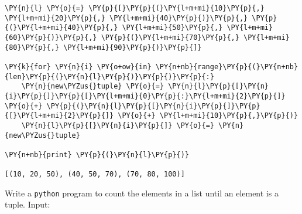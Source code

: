 \begin{Answer}
\begin{codebox}[size=fbox, boxrule=1pt, colback=cellbackground, colframe=cellborder]
\begin{Verbatim}[commandchars=\\\{\}]
\PY{n}{l} \PY{o}{=} \PY{p}{[}\PY{p}{(}\PY{l+m+mi}{10}\PY{p}{,} \PY{l+m+mi}{20}\PY{p}{,} \PY{l+m+mi}{40}\PY{p}{)}\PY{p}{,} \PY{p}{(}\PY{l+m+mi}{40}\PY{p}{,} \PY{l+m+mi}{50}\PY{p}{,} \PY{l+m+mi}{60}\PY{p}{)}\PY{p}{,} \PY{p}{(}\PY{l+m+mi}{70}\PY{p}{,} \PY{l+m+mi}{80}\PY{p}{,} \PY{l+m+mi}{90}\PY{p}{)}\PY{p}{]}

\PY{k}{for} \PY{n}{i} \PY{o+ow}{in} \PY{n+nb}{range}\PY{p}{(}\PY{n+nb}{len}\PY{p}{(}\PY{n}{l}\PY{p}{)}\PY{p}{)}\PY{p}{:}
    \PY{n}{new\PYZus{}tuple} \PY{o}{=} \PY{n}{l}\PY{p}{[}\PY{n}{i}\PY{p}{]}\PY{p}{[}\PY{l+m+mi}{0}\PY{p}{:}\PY{l+m+mi}{2}\PY{p}{]} \PY{o}{+} \PY{p}{(}\PY{n}{l}\PY{p}{[}\PY{n}{i}\PY{p}{]}\PY{p}{[}\PY{l+m+mi}{2}\PY{p}{]} \PY{o}{+} \PY{l+m+mi}{10}\PY{p}{,}\PY{p}{)}
    \PY{n}{l}\PY{p}{[}\PY{n}{i}\PY{p}{]} \PY{o}{=} \PY{n}{new\PYZus{}tuple}
    
\PY{n+nb}{print} \PY{p}{(}\PY{n}{l}\PY{p}{)}

[(10, 20, 50), (40, 50, 70), (70, 80, 100)]
\end{Verbatim}
\end{codebox} 
\end{Answer}

\begin{Exercise}
Write a \texttt{python} program to count the elements in a list until an element is a tuple.
Input:
\begin{Shaded}
\begin{Highlighting}[]
\NormalTok{\{[}\NormalTok{, }\NormalTok{, (}\NormalTok{,}\NormalTok{:}\NormalTok{\}]\}}
\end{Highlighting}
\end{Shaded}
\end{Exercise}

